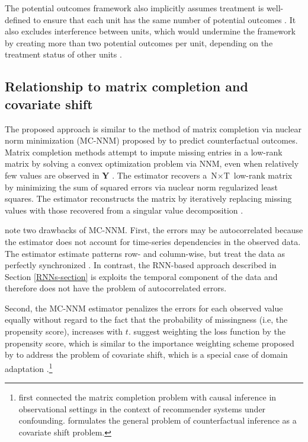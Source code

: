 \documentclass[hidelinks,12pt]{article}
\begin{document}
The potential outcomes framework also implicitly assumes treatment is well-defined to ensure that each unit has the same number of potential outcomes \citep{imbens2015causal}. It also excludes interference between units, which would undermine the framework by creating more than two potential outcomes per unit, depending on the treatment status of other units \citep{rubin1990}.

\subsection{Relationship to matrix completion and covariate shift}

The proposed approach is similar to the method of matrix completion via nuclear norm minimization (MC-NNM) proposed by \citet{athey2017matrix} to predict counterfactual outcomes. Matrix completion methods attempt to impute missing entries in a low-rank matrix by solving a convex optimization problem via NNM, even when relatively few values are observed in $\boldsymbol{Y}$ \citep{candes2009exact,candes2010matrix}. The estimator recovers a $\text{N} \times \text{T}$ low-rank matrix by minimizing the sum of squared errors via nuclear norm regularized least squares. The estimator reconstructs the matrix by iteratively replacing missing values with those recovered from a singular value decomposition \citep{mazumder2010spectral}. 

\citet{athey2017matrix} note two drawbacks of MC-NNM. First, the errors may be autocorrelated because the estimator does not account for time-series dependencies in the observed data. The estimator estimate patterns row- and column-wise, but treat the data as perfectly synchronized \citep{yoon2018estimating}. In contrast, the RNN-based approach described in Section \ref{RNNs-section} is exploits the temporal component of the data and therefore does not have the problem of autocorrelated errors. 

Second, the MC-NNM estimator penalizes the errors for each observed value equally without regard to the fact that the probability of missingness (i.e, the propensity score), increases with $t$. \citet{athey2017matrix} suggest weighting the loss function by the propensity score, which is similar to the importance weighting scheme proposed by \citet{cortes2008sample} to address the problem of covariate shift, which is a special case of domain adaptation \citep{huang2007correcting,bickel2009discriminative,cortes2010learning}.\footnote{\citet{schnabel2016recommendations} first connected the matrix completion problem with causal inference in observational settings in the context of recommender systems under confounding. \citet{johansson2016learning} formulates the general problem of counterfactual inference as a covariate shift problem.} 
\end{document}
